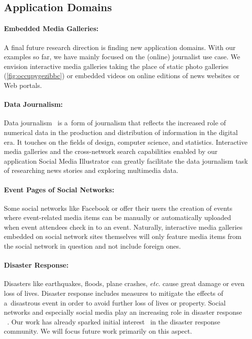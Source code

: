 \subsection{Application Domains}

\paragraph{Embedded Media Galleries:}

A final future research direction is finding new application domains.
With our examples so far, we have mainly focused
on the (online) journalist use case.
We envision interactive media galleries taking the place
of static photo galleries (\autoref{fig:occupygezibbc})
or embedded videos on online editions
of news websites or Web portals.

\paragraph{Data Journalism:}

Data journalism~\cite{rogers2011datajournalism,gray2012data}
is a~form of journalism that reflects the increased role
of numerical data in the production and distribution of information
in the digital era.
It touches on the fields of design, computer science, and statistics.
Interactive media galleries and the cross-network search capabilities enabled by our application Social Media Illustrator
can greatly facilitate the data journalism task of researching news stories and exploring multimedia data.

\paragraph{Event Pages of Social Networks:}

Some social networks like Facebook or \googleplus
offer their users the creation of events where
event-related media items can be manually or automatically
uploaded when event attendees check in to an event.
Naturally, interactive media galleries embedded on
social network sites themselves will only feature media items
from the social network in question and not include foreign ones.

\paragraph{Disaster Response:}

Disasters like earthquakes, floods, plane crashes, \emph{etc.}
cause great damage or even loss of lives.
Disaster response includes measures to
mitigate the effects of a~disastrous event
in order to avoid further loss of lives or property.
Social networks and especially social media
play an increasing role in disaster response%
~\cite{shklovski2008disasterresponse,sutton2008backchannels}.
Our work has already sparked initial interest~\cite{meier2013wikipedia}
in the disaster response community.
We will focus future work primarily on this aspect.


